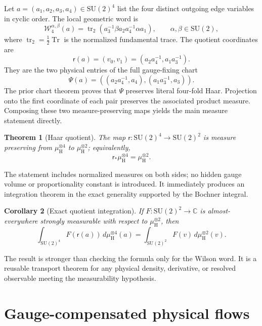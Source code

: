 \documentclass[11pt]{article}
\newtheorem{theorem}{Theorem}[section]
\newtheorem{corollary}[theorem]{Corollary}
\theoremstyle{definition}
\newcommand{\SU}{\mathrm{SU}(2)}
\newcommand{\C}{\mathbb C}
\newcommand{\Haar}{\mu_{\mathrm H}}
\newcommand{\trn}{\operatorname{tr}_2}
\newcommand{\red}{\mathsf r}
\newcommand{\W}{\mathcal W}
\begin{document}
Let $a=(a_1,a_2,a_3,a_4)\in\SU^4$ list the four distinct outgoing edge
variables in cyclic order.  The local geometric word is
\begin{equation}\label{eq:word4}
 \W_4^{\alpha,\beta}(a)
   =\trn(a_3^{-1}\beta a_2a_4^{-1}\alpha a_1),
 \qquad \alpha,\beta\in\SU,
\end{equation}
where $\trn=\frac12\operatorname{Tr}$ is the normalized fundamental trace.
The quotient coordinates are
\begin{equation}\label{eq:red}
 \red(a)=(v_0,v_1)=(a_2a_4^{-1},a_1a_3^{-1}).
\end{equation}
They are the two physical entries of the full gauge-fixing chart
\begin{equation}\label{eq:fullchart}
 \Psi(a)=((a_2a_4^{-1},a_4),(a_1a_3^{-1},a_3)).
\end{equation}
The prior chart theorem proves that $\Psi$ preserves literal four-fold Haar.
Projection onto the first coordinate of each pair preserves the associated
product measure.  Composing these two measure-preserving maps yields the main
measure statement directly.

\begin{theorem}[Haar quotient]\label{thm:haar}
The map $\red:\SU^4\to\SU^2$ is measure preserving from
$\Haar^{\otimes4}$ to $\Haar^{\otimes2}$; equivalently,
\[
 \red_*\Haar^{\otimes4}=\Haar^{\otimes2}.
\]
\end{theorem}

The statement includes normalized measures on both sides; no hidden gauge
volume or proportionality constant is introduced.  It immediately produces
an integration theorem in the exact generality supported by the Bochner
integral.

\begin{corollary}[Exact quotient integration]\label{cor:integral}
If $F:\SU^2\to\C$ is almost-everywhere strongly measurable with respect to
$\Haar^{\otimes2}$, then
\begin{equation}\label{eq:integralquot}
 \int_{\SU^4}F(\red(a))\,d\Haar^{\otimes4}(a)
 =\int_{\SU^2}F(v)\,d\Haar^{\otimes2}(v).
\end{equation}
\end{corollary}

The result is stronger than checking the formula only for the Wilson word.
It is a reusable transport theorem for any physical density, derivative, or
resolved observable meeting the measurability hypothesis.

\section{Gauge-compensated physical flows}
\end{document}
